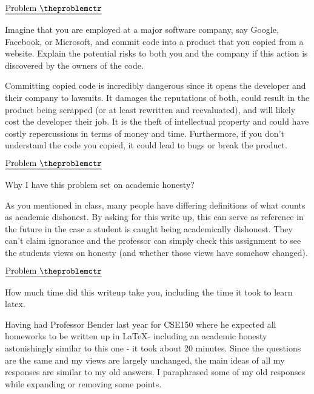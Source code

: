 \documentclass[11pt]{article}
\def\pp{\par\noindent}
\begin{document}
%
%

\addtocounter{problemctr}{1}
\bigskip
\noindent
$\underline{\rm Problem\ \theproblemctr}$\pp
%
Imagine that you are employed at a major software company, say Google,
Facebook, or Microsoft, and commit code into a product that you copied
from a website.  Explain the potential risks to both you and the
company if this action is discovered by the owners of the code.

Committing copied code is incredibly dangerous since it opens the developer and their company to lawsuits. It damages the reputations of both, could result in the product being scrapped (or at least rewritten and reevaluated), and will likely cost the developer their job. It is the theft of intellectual property and could have costly repercussions in terms of money and time. Furthermore, if you don't understand the code you copied, it could lead to bugs or break the product.

\addtocounter{problemctr}{1}
\bigskip
\noindent
$\underline{\rm Problem\ \theproblemctr}$\pp
%
Why I have this problem set on academic honesty?

As you mentioned in class, many people have differing definitions of what counts as academic dishonest. By asking for this write up, this can serve as reference in the future in the case a student is caught being academically dishonest. They can't claim ignorance and the professor can simply check this assignment to see the students views on honesty (and whether those views have somehow changed).

\addtocounter{problemctr}{1}
\bigskip
\noindent
$\underline{\rm Problem\ \theproblemctr}$\pp
%
How much time did this writeup take you, including the time it took to
learn latex.

Having had Professor Bender last year for CSE150 where he expected all homeworks to be written up in \LaTeX - including an academic honesty astonishingly similar to this one - it took about 20 minutes. Since the questions are the same and my views are largely unchanged, the main ideas of all my responses are similar to my old answers. I paraphrased some of my old responses while expanding or removing some points.
\end{document}
